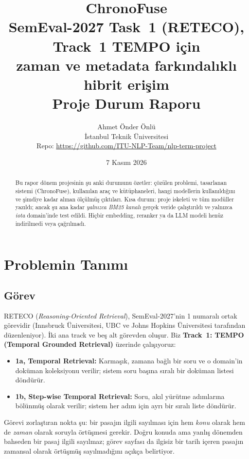 \documentclass[11pt,a4paper]{article}
\title{\textbf{ChronoFuse}\\[2pt]\large SemEval-2027 Task~1 (RETECO), Track~1 TEMPO için\\
zaman ve metadata farkındalıklı hibrit erişim\\[6pt]
\normalsize Proje Durum Raporu}
\author{Ahmet Önder Önlü \\ İstanbul Teknik Üniversitesi \\
\small Repo: \url{https://github.com/ITU-NLP-Team/nlp-term-project}}
\date{7 Kasım 2026}
\begin{document}
\maketitle

\begin{abstract}
\noindent Bu rapor dönem projesinin şu anki durumunu özetler: çözülen problemi, tasarlanan
sistemi (ChronoFuse), kullanılan araç ve kütüphaneleri, hangi modellerin kullanıldığını ve
şimdiye kadar alınan ölçülmüş çıktıları. Kısa durum: proje iskeleti ve tüm modüller yazıldı;
ancak şu ana kadar \emph{yalnızca BM25 kanalı} gerçek veride çalıştırıldı ve yalnızca
\emph{iota} domain'inde test edildi. Hiçbir embedding, reranker ya da LLM modeli henüz
indirilmedi veya çağrılmadı.
\end{abstract}

\tableofcontents
\newpage

\section{Problemin Tanımı}

\subsection{Görev}
RETECO (\emph{Reasoning-Oriented Retrieval}), SemEval-2027'nin 1 numaralı ortak görevidir
(Innsbruck Üniversitesi, UBC ve Johns Hopkins Üniversitesi tarafından düzenleniyor). İki ana
track ve beş alt görevden oluşur. Biz \textbf{Track~1: TEMPO (Temporal Grounded Retrieval)}
üzerinde çalışıyoruz:

\begin{itemize}
  \item \textbf{1a, Temporal Retrieval:} Karmaşık, zamana bağlı bir soru ve o domain'in doküman
        koleksiyonu verilir; sistem soru başına sıralı bir doküman listesi döndürür.
  \item \textbf{1b, Step-wise Temporal Retrieval:} Soru, akıl yürütme adımlarına bölünmüş olarak
        verilir; sistem her adım için ayrı bir sıralı liste döndürür.
\end{itemize}

Görevi zorlaştıran nokta şu: bir pasajın ilgili sayılması için hem \emph{konu} olarak hem de
\emph{zaman} olarak soruyla örtüşmesi gerekir. Doğru konuda ama yanlış dönemden bahseden bir
pasaj ilgili sayılmaz; görev sayfası da ilgisiz bir tarih içeren pasajın zamansal olarak
örtüşmüş sayılmadığını açıkça belirtiyor.
\end{document}
